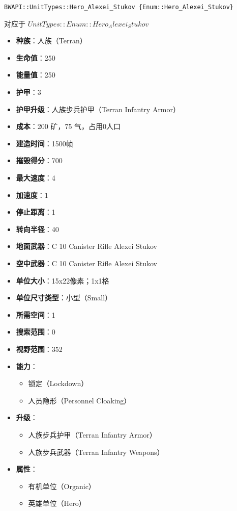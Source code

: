 \begin{tcolorbox}[colback=white, colframe=black!60!white, title=Hero\_Alexei\_Stukov(), arc=0mm]
    \begin{verbatim}
BWAPI::UnitTypes::Hero_Alexei_Stukov {Enum::Hero_Alexei_Stukov}
    \end{verbatim}
    对应于  $ UnitTypes::Enum::Hero_Alexei_Stukov $ 
    \begin{itemize}
        \item \textbf{种族}：人族（Terran）
        \item \textbf{生命值}：250
        \item \textbf{能量值}：250
        \item \textbf{护甲}：3
        \item \textbf{护甲升级}：人族步兵护甲（Terran Infantry Armor）
        \item \textbf{成本}：200 矿，75 气，占用0人口
        \item \textbf{建造时间}：1500帧
        \item \textbf{摧毁得分}：700
        \item \textbf{最大速度}：4
        \item \textbf{加速度}：1
        \item \textbf{停止距离}：1
        \item \textbf{转向半径}：40
        \item \textbf{地面武器}：C 10 Canister Rifle Alexei Stukov
        \item \textbf{空中武器}：C 10 Canister Rifle Alexei Stukov
        \item \textbf{单位大小}：15x22像素；1x1格
        \item \textbf{单位尺寸类型}：小型（Small）
        \item \textbf{所需空间}：1
        \item \textbf{搜索范围}：0
        \item \textbf{视野范围}：352
        \item \textbf{能力}：
            \begin{itemize}
                \item 锁定（Lockdown）
                \item 人员隐形（Personnel Cloaking）
            \end{itemize}
        \item \textbf{升级}：
            \begin{itemize}
                \item 人族步兵护甲（Terran Infantry Armor）
                \item 人族步兵武器（Terran Infantry Weapons）
            \end{itemize}
        \item \textbf{属性}：
            \begin{itemize}
                \item 有机单位（Organic）
                \item 英雄单位（Hero）
            \end{itemize}
    \end{itemize}
\end{tcolorbox}

